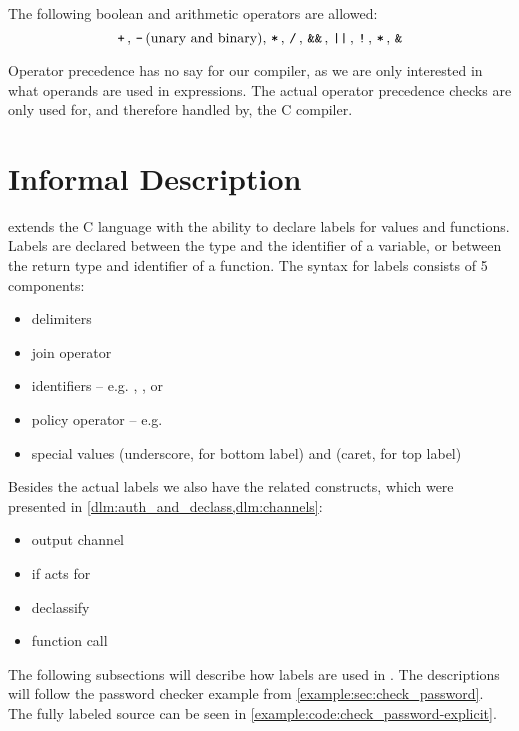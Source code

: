 The following boolean and arithmetic operators are allowed:
\[ \, \texttt{+} \,, \, \texttt{-} \, \text{(unary and binary)}, \, \texttt{*} \,, \, \texttt{/} \,, \, \texttt{\&\&} \,, \, \texttt{||} \,, \, \texttt{!} \,, \, \texttt{*} \, , \, \texttt{\&} \, \]

Operator precedence has no say for our compiler, as we are only interested in what operands are used in expressions.
The actual operator precedence checks are only used for, and therefore handled by, the C compiler.

\section{Informal Description}
\thelang{} extends the C language with the ability to declare labels for values and functions.
Labels are declared between the type and the identifier of a variable, or between the return type and identifier of a function.
The syntax for labels consists of 5 components:
\begin{itemize}
  \item delimiters \dlmc{\{\{ \}\}}
  \item join operator \dlmc{;}
  \item identifiers -- e.g. , , or 
  \item policy operator \dlmc{->} -- e.g. 
  \item special values \dlmc{_} (underscore, for bottom label) and \dlmc{^} (caret, for top label)
\end{itemize}

Besides the actual labels we also have the related constructs, which were presented in \cref{dlm:auth_and_declass,dlm:channels}:
\begin{itemize}
  \item output channel 
  \item if acts for 
  \item declassify 
  \item function call 
\end{itemize}

The following subsections will describe how labels are used in \thelang.
The descriptions will follow the password checker example from \cref{example:sec:check_password}.
The fully labeled source can be seen in \cref{example:code:check_password-explicit}.



